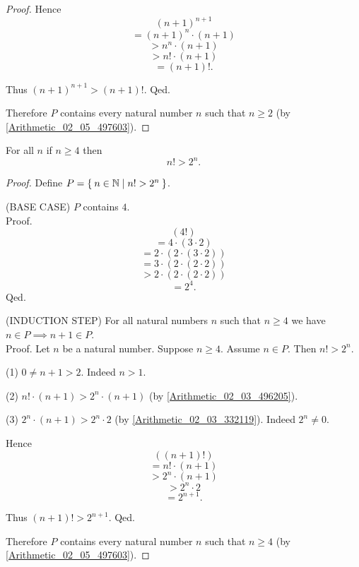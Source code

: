 \documentclass[../../arithmetic.ftl.tex]{subfiles}
\begin{document}
\begin{forthel}
\begin{proof}
        Hence
        \[   (n + 1)^{n + 1} \]
        \[ = (n + 1)^{n} \cdot (n + 1) \]
        \[ > n^{n} \cdot (n + 1) \]
        \[ > n! \cdot (n + 1) \]
        \[ = (n + 1)!. \]

        Thus $(n + 1)^{n + 1} > (n + 1)!$.
      Qed.

      Therefore $P$ contains every natural number $n$ such that $n \geq 2$ (by \ref{Arithmetic_02_05_497603}).
    \end{proof}


    \begin{proposition}\label{Arithmetic_02_06_493411}
      For all $n$ if $n \geq 4$ then \[ n! > 2^{n}. \]
    \end{proposition}
    \begin{proof}
      Define $P = \Set{n \in \mathbb{N} | n! > 2^{n}}$.

      (BASE CASE) $P$ contains $4$. \\
      Proof.
        \[   (4!) \]
        \[ = 4 \cdot (3 \cdot 2) \]
        \[ = 2 \cdot (2 \cdot (3 \cdot 2)) \]
        \[ = 3 \cdot (2 \cdot (2 \cdot 2)) \]
        \[ > 2 \cdot (2 \cdot (2 \cdot 2)) \]
        \[ = 2^{4}. \]
      Qed.

      (INDUCTION STEP) For all natural numbers $n$ such that $n \geq 4$ we have $n \in P \implies n + 1 \in P$. \\
      Proof.
        Let $n$ be a natural number.
        Suppose $n \geq 4$.
        Assume $n \in P$.
        Then $n! > 2^{n}$.

        (1) $0 \neq n + 1 > 2$.
        Indeed $n > 1$.

        (2) $n! \cdot (n + 1) > 2^{n} \cdot (n + 1)$ (by \ref{Arithmetic_02_03_496205}).

        (3) $2^{n} \cdot (n + 1) > 2^{n} \cdot 2$ (by \ref{Arithmetic_02_03_332119}).
        Indeed $2^{n} \neq 0$.

        Hence
        \[   ((n + 1)!) \]
        \[ = n! \cdot (n + 1) \]
        \[ > 2^{n} \cdot (n + 1) \]
        \[ > 2^{n} \cdot 2 \]
        \[ = 2^{n + 1}. \]

        Thus $(n + 1)! > 2^{n + 1}$.
      Qed.

      Therefore $P$ contains every natural number $n$ such that $n \geq 4$ (by \ref{Arithmetic_02_05_497603}).
    \end{proof}
  \end{forthel}
\end{document}
